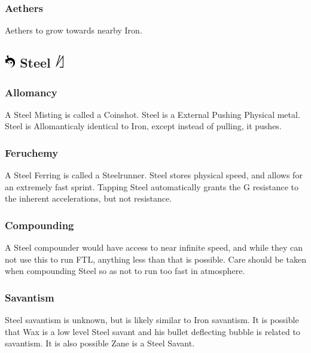 \documentclass[conference]{IEEEtran}
\newcommand{\n}{\hfill\break}
\begin{document}
\subsubsection*{\textbf{Aethers}}
Aethers to grow towards nearby Iron.\cite{ToES-CH26}
\n
\subsection*{\includegraphics[height=1em]{images/Steel.png}  \textbf{Steel} \includegraphics[height=1em]{images/Steel_(Feruchemy).png}}
\subsubsection*{\textbf{Allomancy}}
A Steel Misting is called a Coinshot.\cite{ARS}  Steel is a External Pushing Physical metal.\cite{AL-TB}  Steel is Allomanticaly identical to Iron, except instead of pulling, it pushes.\cite{ARS}\\
\subsubsection*{\textbf{Feruchemy}}
A Steel Ferring is called a Steelrunner.  Steel stores physical speed, and allows for an extremely fast sprint.\cite{ARS}  Tapping Steel automatically grants the G resistance to the inherent accelerations,\cite{steel-g-air} but not  resistance.\cite{steel-air}\\
\subsubsection*{\textbf{Compounding}}
A Steel compounder would have access to near infinite speed, and while they can not use this to run FTL,\cite{steel-ftl} anything less than that is possible.  Care should be taken when compounding Steel so as not to run too fast in atmosphere.\cite{steel-air}\\
\subsubsection*{\textbf{Savantism}}
Steel savantism is unknown, but is likely similar to Iron savantism.  It is possible that Wax is a low level Steel savant and his bullet deflecting bubble is related to savantism.\cite{AoL-pre}\cite{wax-savant}
It is also possible Zane is a Steel Savant.\cite{WoA-CH17}\\
\end{document}
